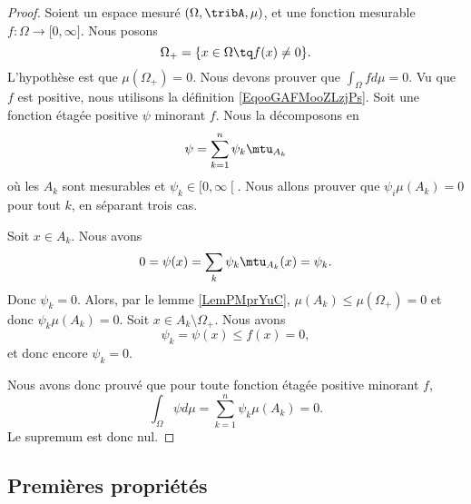 \begin{proof}
	Soient un espace mesuré \( (\Omega, \tribA,\mu)\), et une fonction mesurable \(f \colon \Omega\to \mathopen[ 0 , \infty \mathclose]\). Nous posons
	\begin{equation}
		\Omega_+=\{ x\in \Omega\tq f(x)\neq 0 \}.
	\end{equation}
	L'hypothèse est que \( \mu(\Omega_+)=0\). Nous devons prouver que \( \int_{\Omega}fd\mu=0\). Vu que \( f\) est positive, nous utilisons la définition \ref{EqooGAFMooZLzjPs}. Soit une fonction étagée positive \( \psi\) minorant \( f\). Nous la décomposons en
	\begin{equation}
		\psi=\sum_{k=1}^n\psi_k\mtu_{A_k}
	\end{equation}
	où les \( A_k\) sont mesurables et \( \psi_k\in\mathopen[ 0 , \infty \mathclose[\). Nous allons prouver que \( \psi_i\mu(A_k)=0\) pour tout \( k\), en séparant trois cas.

	\begin{subproof}
		\spitem[Si \( A_k\cap \Omega_+=\emptyset\)]
		Soit \( x\in A_k\). Nous avons
		\begin{equation}
			0=\psi(x)=\sum_k\psi_k\mtu_{A_k}(x)=\psi_k.
		\end{equation}
		Donc \( \psi_k=0\).
		Alors, par le lemme \ref{LemPMprYuC}, \( \mu(A_k)\leq \mu(\Omega_+)=0\) et donc \( \psi_k\mu(A_k)=0\).
		Soit \( x\in A_k\setminus \Omega_+\). Nous avons
		\begin{equation}
			\psi_k=\psi(x)\leq f(x)=0,
		\end{equation}
		et donc encore \( \psi_k=0\).
	\end{subproof}
	Nous avons donc prouvé que pour toute fonction étagée positive minorant \( f\),
	\begin{equation}
		\int_{\Omega}\psi d\mu= \sum_{k=1}^n\psi_k\mu(A_k)=0.
	\end{equation}
	Le supremum est donc nul.
\end{proof}

\subsection{Premières propriétés}

